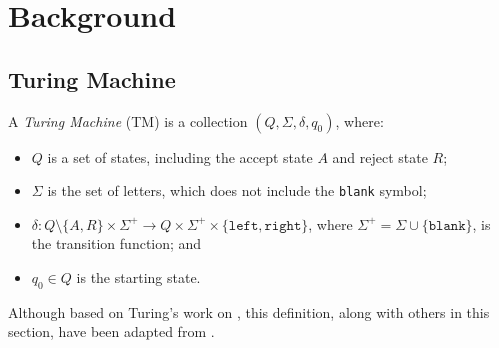 \chapter{Background}

\section{Turing Machine}

A \emph{Turing Machine} (TM) is a collection $(Q, \Sigma, \delta, q_0)$, where:
\begin{itemize}
    \item $Q$ is a set of states, including the accept state $A$ and reject state $R$;
    \item $\Sigma$ is the set of letters, which does not include the \texttt{blank} symbol;
    \item $\delta \colon Q \setminus \{A, R\} \times \Sigma^+ \to Q \times \Sigma^+ \times \{\texttt{left}, \texttt{right}\}$, where $\Sigma^+ = \Sigma \cup \{\texttt{blank}\}$, is the transition function; and
    \item $q_0 \in Q$ is the starting state.
\end{itemize}
Although based on Turing's work on \cite{turing1936computable}, this definition, along with others in this section, have been adapted from \cite{hopcroft2001automata}.

